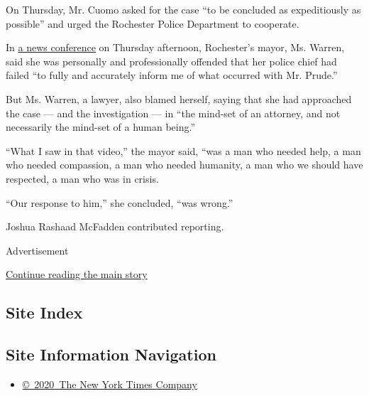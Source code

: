 On Thursday, Mr. Cuomo asked for the case ``to be concluded ‎as
expeditiously as possible'' and urged the Rochester Police Department to
cooperate.

In
\href{https://www.facebookcorewwwi.onion/watch/live/?v=997967440651864\&ref=search}{a
news conference} on Thursday afternoon, Rochester's mayor, Ms. Warren,
said she was personally and professionally offended that her police
chief had failed ``to fully and accurately inform me of what occurred
with Mr. Prude.''

But Ms. Warren, a lawyer, also blamed herself, saying that she had
approached the case --- and the investigation --- in ``the mind-set of
an attorney, and not necessarily the mind-set of a human being.''

``What I saw in that video,'' the mayor said, ``was a man who needed
help, a man who needed compassion, a man who needed humanity, a man who
we should have respected, a man who was in crisis.

``Our response to him,'' she concluded, ``was wrong.''

Joshua Rashaad McFadden contributed reporting.

Advertisement

\protect\hyperlink{after-bottom}{Continue reading the main story}

\hypertarget{site-index}{%
\subsection{Site Index}\label{site-index}}

\hypertarget{site-information-navigation}{%
\subsection{Site Information
Navigation}\label{site-information-navigation}}

\begin{itemize}
\tightlist
\item
  \href{https://help.nytimes3xbfgragh.onion/hc/en-us/articles/115014792127-Copyright-notice}{©~2020~The
  New York Times Company}
\end{itemize}

